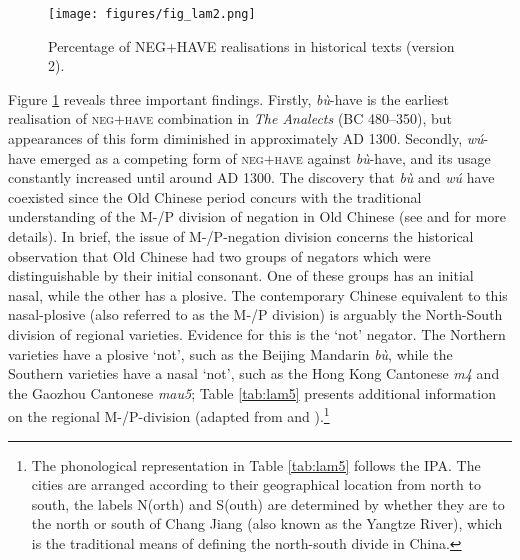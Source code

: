 \documentclass[output=paper]{langscibook}
\begin{document}
\begin{figure}
  \texttt{[image: figures/fig\_lam2.png]}
  \caption{Percentage of NEG+HAVE realisations in historical texts (version 2).}
  \label{fig:lam2}
\end{figure}

Figure \ref{fig:lam2} reveals three important findings. Firstly, \textit{bù}-have is the earliest realisation of \textsc{neg}+\textsc{have} combination in \emph{The Analects} (BC 480–350), but appearances of this form diminished in approximately AD 1300. Secondly, \textit{wú}-have emerged as a competing form of \textsc{neg}+\textsc{have} against \textit{bù}-have, and its usage constantly increased until around AD 1300. The discovery that \textit{bù} and \textit{wú} have coexisted since the Old Chinese period concurs with the traditional understanding of the M-/P division of negation in Old Chinese (see \citealt{Hashimoto1985} and \citealt{Zhang2002} for more details). In brief, the issue of M-/P-negation division concerns the historical observation that Old Chinese had two groups of negators which were distinguishable by their initial consonant. One of these groups has an initial nasal, while the other has a plosive. The contemporary Chinese equivalent to this nasal-plosive (also referred to as the M-/P division) is arguably the North-South division of regional varieties. Evidence for this is the `not' negator. The Northern varieties have a plosive `not', such as the Beijing Mandarin \textit{bù}, while the Southern varieties have a nasal `not', such as the Hong Kong Cantonese \textit{m4} and the Gaozhou Cantonese \textit{mau5}; Table \ref{tab:lam5} presents additional information on the regional M-/P-division (adapted from \citealt{Hashimoto1985} and \citealt{Zhang2002}).\footnote{The phonological representation in Table \ref{tab:lam5} follows the IPA. The cities are arranged according to their geographical location from north to south, the labels N(orth) and S(outh) are determined by whether they are to the north or south of Chang Jiang (also known as the Yangtze River), which is the traditional means of defining the north-south divide in China.} 
\end{document}
